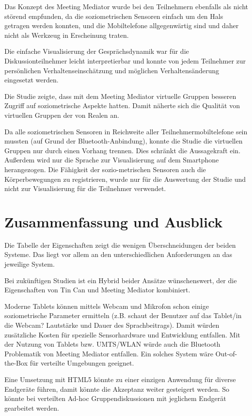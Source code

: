 \documentclass{seminarvorlage}
\begin{document}
Das Konzept des Meeting Mediator wurde bei den Teilnehmern ebenfalls als nicht
störend empfunden, da die soziometrischen Sensoren einfach um den Hals getragen
werden konnten, und die Mobiltelefone allgegenwärtig sind und daher nicht als
Werkzeug in Erscheinung traten.

Die einfache Visualisierung der Gesprächsdynamik war für die
Diskussionteilnehmer leicht interpretierbar und konnte von jedem Teilnehmer zur
per\-sön\-lich\-en Ver\-haltens\-ein\-schätz\-ung und möglichen
Verhaltensänderung eingesetzt werden.

Die Studie \cite{KimChaHolPent2008} zeigte, dass mit dem Meeting Mediator
virtuelle Gruppen besseren Zugriff auf soziometrische Aspekte hatten. Damit
näherte sich die Qualität von virtuellen Gruppen der von Realen an.

Da alle soziometrischen Sensoren in Reichweite aller Teilnehmermobiltelefone
sein mussten (auf Grund der Bluetooth-Anbindung), konnte die Studie
\cite{KimChaHolPent2008} die virtuellen Gruppen nur durch einen Vorhang trennen.
Dies schränkt die Aussagekraft ein.
Außerdem wird nur die Sprache zur Visualisierung auf dem Smartphone
herangezogen. Die Fähigkeit der sozio-metrischen Sensoren auch die
Körperbewegungen zu registrieren, wurde nur für die Auswertung der Studie
\cite{KimChaHolPent2008} und nicht zur Visualisierung für die Teilnehmer
verwendet.


\section{Zusammenfassung und Ausblick}
Die Tabelle der Eigenschaften zeigt die wenigen Über\-schneid\-ung\-en
der beiden Systeme. Das liegt vor allem an den unterschiedlichen Anforderungen
an das jeweilige System.

Bei zukünftigen Studien ist ein Hybrid beider Ansätze
wün\-schens\-wert, der die Eigenschaften von Tin Can und Meeting
Mediator kombiniert.

Moderne Tablets können mittels Webcam und Mikrofon schon einige soziometrische
Parameter ermitteln (z.B. schaut der Benutzer auf das Tablet/in die Webcam?
Lautstärke und Dauer des Sprachbeitrags). Damit würden zusätzliche Kosten für
spezielle Sensorhardware und Entwicklung entfallen. Mit der Nutzung von Tablets
bzw.
UMTS/WLAN würde auch die Bluetooth Problematik von Meeting Mediator entfallen.
Ein solches System wäre Out-of-the-Box für verteilte Umgebungen geeignet.

Eine Umsetzung mit HTML5 könnte zu einer einzigen Anwendung für diverse
Endgeräte führen, damit könn\-te die Akzeptanz weiter gesteigert werden. So
könn\-te bei verteilten Ad-hoc Gruppendiskussionen mit jeglichem Endgerät
gearbeitet werden.
\end{document}
